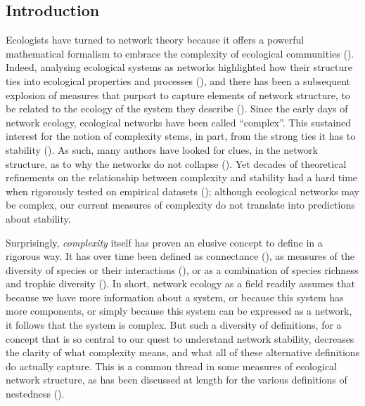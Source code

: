 \begin{refsection}

\section{Introduction}

Ecologists have turned to network theory because it offers a powerful
mathematical formalism to embrace the complexity of ecological communities
(\cite{Bascompte2007PlaMut}). Indeed, analysing ecological systems as networks
highlighted how their structure ties into ecological properties and processes
(\cite{Proulx2005NetThi, Poulin2010NetAna}), and there has been a subsequent
explosion of measures that purport to capture elements of network structure, to be related to the ecology of the system they describe (\cite{Delmas2018Analysing}). Since the early days of network ecology, ecological networks have been called
``complex''. This sustained interest for the notion of complexity stems, in
part, from the strong ties it has to stability (\cite{Landi2018Complexity}). As such,
many authors have looked for clues, in the network structure, as to why the
networks do not collapse (\cite{Borrelli2015SelIns, Staniczenko2013GhoNes,
Gravel2016StaCom, Brose2006AllSca}). Yet decades of theoretical refinements on
the relationship between complexity and stability had a hard time when
rigorously tested on empirical datasets (\cite{Jacquet2016NoCom}); although
ecological networks may be complex, our current measures of complexity do not
translate into predictions about stability.

Surprisingly, \emph{complexity} itself has proven an elusive concept to define
in a rigorous way. It has over time been defined as connectance
(\cite{Rozdilsky2001ComCan}), as measures of the diversity of species or their
interactions (\cite{Landi2018Complexity}), or as a combination of species richness and trophic diversity (\cite{Duffy2007FunRol}). In short, network ecology as a field readily assumes that because we have more information about a system, or because this system has more components, or simply because this system can be expressed as a network, it follows that the system is complex. But such a diversity of definitions, for a concept that is so central to our quest to understand network stability, decreases the clarity of what complexity means, and what all of these alternative definitions do actually capture. This is a common thread in some measures of ecological network structure, as has been discussed at length for
the various definitions of nestedness (\cite{Ulrich2009ConSG}).


\end{refsection}
